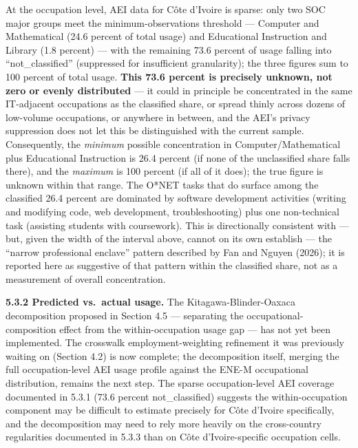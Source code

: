 \documentclass[
  11pt,
]{article}
\begin{document}
At the occupation level, AEI data for Côte d'Ivoire is sparse: only two
SOC major groups meet the minimum-observations threshold --- Computer
and Mathematical (24.6 percent of total usage) and Educational
Instruction and Library (1.8 percent) --- with the remaining 73.6
percent of usage falling into ``not\_classified'' (suppressed for
insufficient granularity); the three figures sum to 100 percent of total
usage. \textbf{This 73.6 percent is precisely unknown, not zero or
evenly distributed} --- it could in principle be concentrated in the
same IT-adjacent occupations as the classified share, or spread thinly
across dozens of low-volume occupations, or anywhere in between, and the
AEI's privacy suppression does not let this be distinguished with the
current sample. Consequently, the \emph{minimum} possible concentration
in Computer/Mathematical plus Educational Instruction is 26.4 percent
(if none of the unclassified share falls there), and the \emph{maximum}
is 100 percent (if all of it does); the true figure is unknown within
that range. The O*NET tasks that do surface among the classified 26.4
percent are dominated by software development activities (writing and
modifying code, web development, troubleshooting) plus one non-technical
task (assisting students with coursework). This is directionally
consistent with --- but, given the width of the interval above, cannot
on its own establish --- the ``narrow professional enclave'' pattern
described by Fan and Nguyen (2026); it is reported here as suggestive of
that pattern within the classified share, not as a measurement of
overall concentration.

\textbf{5.3.2 Predicted vs.~actual usage.} The Kitagawa-Blinder-Oaxaca
decomposition proposed in Section 4.5 --- separating the
occupational-composition effect from the within-occupation usage gap ---
has not yet been implemented. The crosswalk employment-weighting
refinement it was previously waiting on (Section 4.2) is now complete;
the decomposition itself, merging the full occupation-level AEI usage
profile against the ENE-M occupational distribution, remains the next
step. The sparse occupation-level AEI coverage documented in 5.3.1 (73.6
percent not\_classified) suggests the within-occupation component may be
difficult to estimate precisely for Côte d'Ivoire specifically, and the
decomposition may need to rely more heavily on the cross-country
regularities documented in 5.3.3 than on Côte d'Ivoire-specific
occupation cells.
\end{document}

